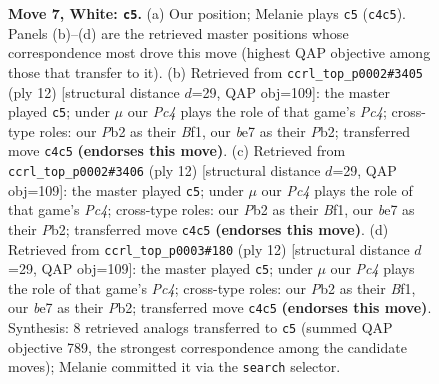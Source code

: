 \documentclass[11pt]{article}
\begin{document}
\begin{figure}[p]
\caption{\textbf{Move 7, White: \texttt{c5}.} (a) Our position; Melanie plays \texttt{c5} (\texttt{c4c5}). Panels (b)--(d) are the retrieved master positions whose correspondence most drove this move (highest QAP objective among those that transfer to it). (b) Retrieved from \texttt{ccrl\_top\_p0002\#3405} (ply 12) [structural distance $d$=29, QAP obj=109]: the master played \texttt{c5}; under $\mu$ our \emph{Pc4} plays the role of that game's \emph{Pc4}; cross-type roles: our \emph{P}b2 as their \emph{B}f1, our \emph{b}e7 as their \emph{P}b2; transferred move \texttt{c4c5} \textbf{(endorses this move)}. (c) Retrieved from \texttt{ccrl\_top\_p0002\#3406} (ply 12) [structural distance $d$=29, QAP obj=109]: the master played \texttt{c5}; under $\mu$ our \emph{Pc4} plays the role of that game's \emph{Pc4}; cross-type roles: our \emph{P}b2 as their \emph{B}f1, our \emph{b}e7 as their \emph{P}b2; transferred move \texttt{c4c5} \textbf{(endorses this move)}. (d) Retrieved from \texttt{ccrl\_top\_p0003\#180} (ply 12) [structural distance $d$=29, QAP obj=109]: the master played \texttt{c5}; under $\mu$ our \emph{Pc4} plays the role of that game's \emph{Pc4}; cross-type roles: our \emph{P}b2 as their \emph{B}f1, our \emph{b}e7 as their \emph{P}b2; transferred move \texttt{c4c5} \textbf{(endorses this move)}. Synthesis: 8 retrieved analogs transferred to \texttt{c5} (summed QAP objective 789, the strongest correspondence among the candidate moves); Melanie committed it via the \texttt{search} selector.}
\label{fig:thought-m12}
\end{figure}

\clearpage
\end{document}

